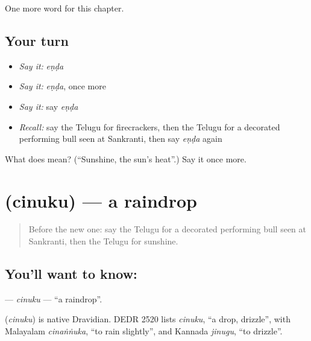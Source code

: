 \begin{grammarlens}[title={What you've built}]
One more word for this chapter.
\end{grammarlens}

\subsection*{Your turn}
\begin{itemize}
\raggedright
  \item \emph{Say it:} \emph{eṇḍa}
  \item \emph{Say it:} \emph{eṇḍa}, once more
  \item \emph{Say it:} say \emph{eṇḍa}
  \item \emph{Recall:} say the Telugu for firecrackers, then the Telugu for a decorated performing bull seen at Sankranti, then say \emph{eṇḍa} again
\end{itemize}

\begin{tcolorbox}[breakable,colback=teal!4,colframe=teal!35!black,title={Before you move on}]
What does  mean? (\textquotedblleft{}Sunshine, the sun's heat\textquotedblright{}.) Say it once more.
\end{tcolorbox}
\section[\texorpdfstring{\te{చినుకు} (cinuku)}{చినుకు (cinuku)}]{ (cinuku) — a raindrop}

\label{lesson:TE-C229-cinuku}



\begin{quote}
Before the new one: say the Telugu for a decorated performing bull seen at Sankranti, then the Telugu for sunshine.
\end{quote}

\subsection*{You'll want to know: }
\textbf{} — \emph{cinuku} — \textquotedblleft{}a raindrop\textquotedblright{}.

\begin{cousinweb}
\textbf{} (\emph{cinuku}) is native Dravidian. DEDR 2520 lists \emph{cinuku}, \textquotedblleft{}a drop, drizzle\textquotedblright{}, with Malayalam \emph{cinaṅṅuka}, \textquotedblleft{}to rain slightly\textquotedblright{}, and Kannada \emph{jinugu}, \textquotedblleft{}to drizzle\textquotedblright{}.
\end{cousinweb}

